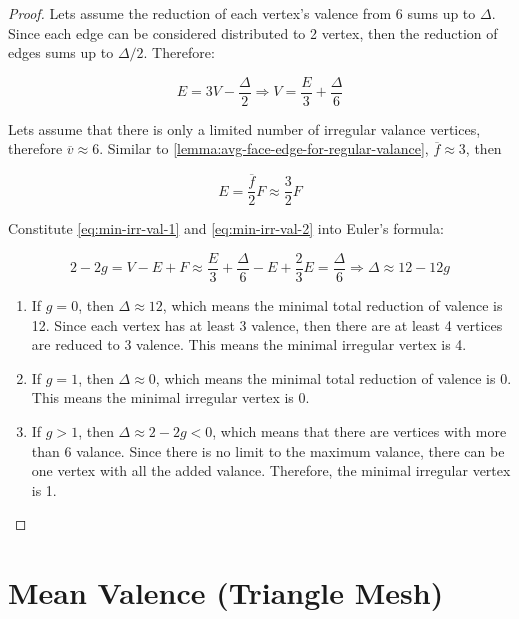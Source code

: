 \begin{proof}
    Lets assume the reduction of each vertex's valence from 6 sums up to $\Delta$. Since each edge can be considered distributed to 2 vertex, then the reduction of edges sums up to $\Delta/2$. Therefore:

    \begin{equation}
        E = 3V - \frac{\Delta}{2} \Rightarrow V = \frac{E}{3} + \frac{\Delta}{6}
        \label{eq:min-irr-val-1}
    \end{equation}

    Lets assume that there is only a limited number of irregular valance vertices, therefore $\overline{v} \approx 6$. Similar to \autoref{lemma:avg-face-edge-for-regular-valance}, $\overline{f} \approx 3$, then

    \begin{equation}        
        E = \frac{\overline{f}}{2}F \approx \frac{3}{2} F
        \label{eq:min-irr-val-2}
    \end{equation}

    Constitute \autoref{eq:min-irr-val-1} and \autoref{eq:min-irr-val-2} into Euler's formula:

    \begin{equation}
        2 - 2g = V - E + F \approx \frac{E}{3} + \frac{\Delta}{6} - E + \frac{2}{3}E = \frac{\Delta}{6}
        \Rightarrow \Delta \approx 12 - 12g
    \end{equation}

    \begin{enumerate}
        \item If $g = 0$, then $\Delta \approx 12$, which means the minimal total reduction of valence is 12. Since each vertex has at least 3 valence, then there are at least 4 vertices are reduced to 3 valence. This means the minimal irregular vertex is 4.
        \item If $g = 1$, then $\Delta \approx 0$, which means the minimal total reduction of valence is 0. This means the minimal irregular vertex is 0.
        \item If $g > 1$, then $\Delta \approx 2 - 2g < 0$, which means that there are vertices with more than 6 valance. Since there is no limit to the maximum valance, there can be one vertex with all the added valance. Therefore, the minimal irregular vertex is 1.
    \end{enumerate}
\end{proof}

\section{Mean Valence (Triangle Mesh)}

